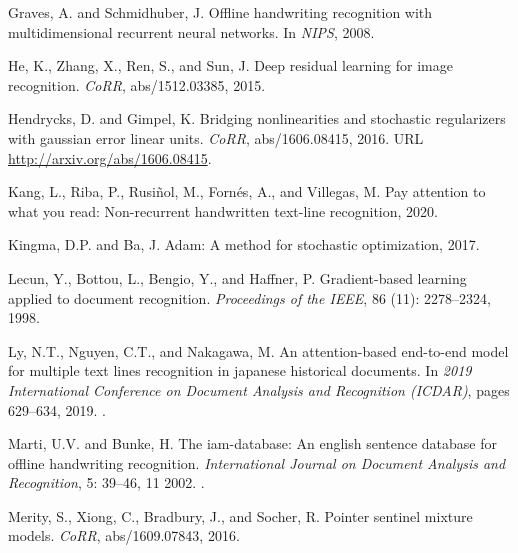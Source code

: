 \documentclass[runningheads]{llncs}
\begin{document}
\begin{thebibliography}{33}
Graves, A. and Schmidhuber, J.
\newblock Offline handwriting recognition with multidimensional recurrent
  neural networks.
\newblock In \emph{NIPS}, 2008.

He, K., Zhang, X., Ren, S., and Sun, J.
\newblock Deep residual learning for image recognition.
\newblock \emph{CoRR}, abs/1512.03385, 2015.

Hendrycks, D. and Gimpel, K.
\newblock Bridging nonlinearities and stochastic regularizers with gaussian
  error linear units.
\newblock \emph{CoRR}, abs/1606.08415, 2016.
\newblock URL \url{http://arxiv.org/abs/1606.08415}.

Kang, L., Riba, P., Rusiñol, M., Fornés, A., and Villegas, M.
\newblock Pay attention to what you read: Non-recurrent handwritten text-line
  recognition, 2020.

Kingma, D.P. and Ba, J.
\newblock Adam: A method for stochastic optimization, 2017.

{Lecun}, Y., {Bottou}, L., {Bengio}, Y., and {Haffner}, P.
\newblock Gradient-based learning applied to document recognition.
\newblock \emph{Proceedings of the IEEE}, 86 (11):
  2278--2324, 1998.

Ly, N.T., Nguyen, C.T., and Nakagawa, M.
\newblock An attention-based end-to-end model for multiple text lines
  recognition in japanese historical documents.
\newblock In \emph{2019 International Conference on Document Analysis and
  Recognition (ICDAR)}, pages 629--634, 2019.
\newblock {}.

Marti, U.V. and Bunke, H.
\newblock The iam-database: An english sentence database for offline
  handwriting recognition.
\newblock \emph{International Journal on Document Analysis and Recognition},
  5: 39--46, 11 2002.
\newblock {}.

Merity, S., Xiong, C., Bradbury, J., and Socher, R.
\newblock Pointer sentinel mixture models.
\newblock \emph{CoRR}, abs/1609.07843, 2016.


\end{thebibliography}
\end{document}
